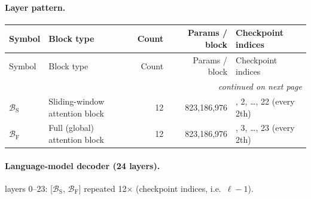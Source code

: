 \documentclass[10pt,a4paper]{article}
\theoremstyle{definition}
\begin{document}
\paragraph{Layer pattern.}
\begin{longtable}{l>{\raggedright\arraybackslash}p{5.6cm}rr>{\raggedright\arraybackslash}p{4.4cm}}
\toprule
Symbol & Block type & Count & Params / block & Checkpoint indices \\
\midrule
\endfirsthead
\toprule
Symbol & Block type & Count & Params / block & Checkpoint indices \\
\midrule
\endhead
\midrule \multicolumn{5}{r}{\textit{continued on next page}} \\
\endfoot
\bottomrule
\endlastfoot
$\mathcal{B}_{\mathrm{S}}$ & Sliding-window attention block & 12 & 823,186,976 & 0, 2, \ldots, 22 (every 2th) \\
$\mathcal{B}_{\mathrm{F}}$ & Full (global) attention block & 12 & 823,186,976 & 1, 3, \ldots, 23 (every 2th) \\
\end{longtable}
\paragraph{Language-model decoder (24 layers).} 
layers 0--23: [$\mathcal{B}_{\mathrm{S}}$, $\mathcal{B}_{\mathrm{F}}$] repeated 12$\times$ (checkpoint indices, i.e.\ $\ell-1$).
\end{document}
